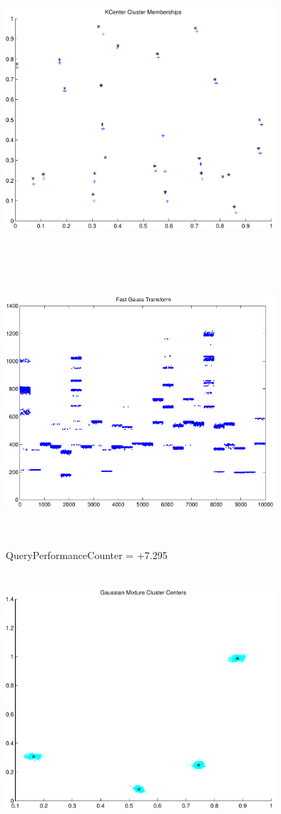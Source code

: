 \documentclass[9pt]{article}
\theoremstyle{plain}
\theoremstyle{definition}
\theoremstyle{remark}
\numberwithin{equation}{section}
\begin{document}
\includegraphics[width=10.0cm,height=10.0cm]{KCenterClusterMemberships_24_Centers.pdf}

\includegraphics[width=10.0cm,height=10.0cm]{FGT24_Centers.pdf}

QueryPerformanceCounter  =  +7.295
\includegraphics[width=10.0cm,height=10.0cm]{GaussianMixture_ClusterCenters4_Centers.pdf}
\end{document}
